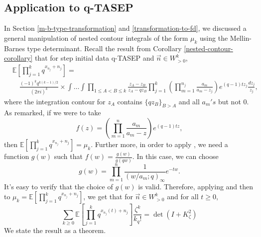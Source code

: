 \subsection{Application to q-TASEP}
\label{mb-application-to-qtasep}
In Section \ref{m-b-type-transformation} and \ref{transformation-to-fd}, we discussed a general manipulation of nested contour integrals of the form $\mu_k$ using the Mellin-Barnes type determinant. Recall the result from Corollary \ref{nested-contour-corollary} that for step initial data q-TASEP and $\vec{n} \in W^k_{>0}$, 
\begin{align*}
& \mathbb{E} \left[ \prod_{j=1}^k q^{x_{n_j}+n_j} \right] = \\
& \quad \frac{(-1)^k q^{k(k-1)/2}}{(2 \pi i)^k} \times \int \dots \int \prod_{1 \le A < B \le k} \frac{z_A - z_B}{z_A - qz_B} \prod_{j=1}^k \left( \prod_{m=1}^{n_j} \frac{a_m}{a_m - z_j}\right) e^{(q-1)tz_j} \frac{dz_j}{z_j},
\end{align*}
where the integration contour for $z_A$ contains $\{qz_B\}_{B > A}$ and all $a_m's$ but not $0$. As remarked, if we were to take $$f(z) = \left( \prod_{m=1}^{n} \frac{a_m}{a_m - z} \right) e^{(q-1)tz},$$ then $\mathbb{E} \left[ \prod_{j=1}^k q^{x_{n_j}+n_j} \right] = \mu_k$. Further more, in order to apply , we need a function $g(w)$ such that $f(w) = \frac{g(w)}{g(qw)}$. In this case, we can choose $$g(w) = \prod_{m=1}^{n} \frac{1}{(w/a_m; q)_{\infty}} e^{-tw}.$$ It's easy to verify that the choice of $g(w)$ is valid. Therefore, applying  and then  to $\mu_k = \mathbb{E} \left[ \prod_{j=1}^k q^{x_{n_j}+n_j} \right]$, we get that for $\vec{n} \in W^k_{>0}$ and for all $t \ge 0$,
\begin{equation}
\label{m-b-application-to-qtasep-raw}
\sum_{k \ge 0} \mathbb{E} \left[ \prod_{j=1}^k q^{x_{n_j}(t)+n_j} \right] \frac{\zeta^k}{k_q!} = \det(I+K^2_{\zeta})
\end{equation}
We state the result as a theorem. 
